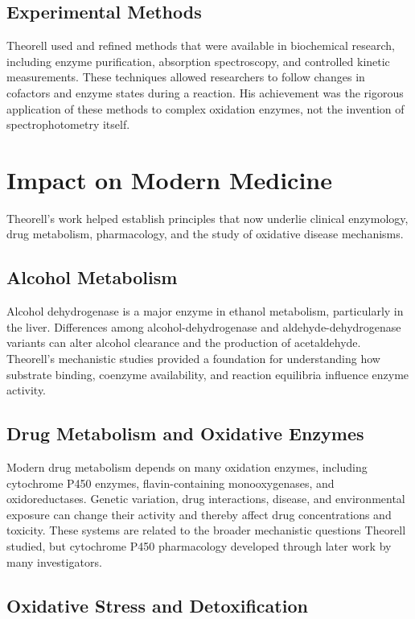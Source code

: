 \subsection{Experimental Methods}

Theorell used and refined methods that were available in biochemical research, including enzyme purification, absorption spectroscopy, and controlled kinetic measurements. These techniques allowed researchers to follow changes in cofactors and enzyme states during a reaction. His achievement was the rigorous application of these methods to complex oxidation enzymes, not the invention of spectrophotometry itself.

\section{Impact on Modern Medicine}

Theorell's work helped establish principles that now underlie clinical enzymology, drug metabolism, pharmacology, and the study of oxidative disease mechanisms.

\subsection{Alcohol Metabolism}

Alcohol dehydrogenase is a major enzyme in ethanol metabolism, particularly in the liver. Differences among alcohol-dehydrogenase and aldehyde-dehydrogenase variants can alter alcohol clearance and the production of acetaldehyde. Theorell's mechanistic studies provided a foundation for understanding how substrate binding, coenzyme availability, and reaction equilibria influence enzyme activity.

\subsection{Drug Metabolism and Oxidative Enzymes}

Modern drug metabolism depends on many oxidation enzymes, including cytochrome P450 enzymes, flavin-containing monooxygenases, and oxidoreductases. Genetic variation, drug interactions, disease, and environmental exposure can change their activity and thereby affect drug concentrations and toxicity. These systems are related to the broader mechanistic questions Theorell studied, but cytochrome P450 pharmacology developed through later work by many investigators.

\subsection{Oxidative Stress and Detoxification}

